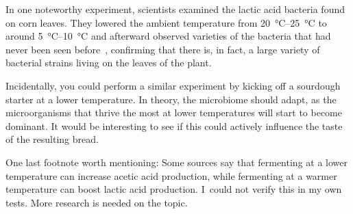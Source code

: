 In one noteworthy experiment, scientists examined the lactic acid bacteria
found on corn leaves. They lowered the ambient temperature from \qtyrange{20}{25}{\degreeCelsius} to around
\qtyrange{5}{10}{\degreeCelsius} and afterward observed varieties of the bacteria that had never been
seen before~\cite{temperature+bacteria+corn}, confirming that there is, in
fact, a large variety of bacterial strains living on the leaves of the plant.

Incidentally, you could perform a similar experiment by kicking off a sourdough
starter at a lower temperature. In theory, the microbiome should adapt, as the
microorganisms that thrive the most at lower temperatures will start to become
dominant. It would be interesting to see if this could actively influence the
taste of the resulting bread.

One last footnote worth mentioning: Some sources say that fermenting at a
lower temperature can increase acetic acid production, while fermenting at a
warmer temperature can boost lactic acid production. I~could not verify this
in my own tests. More research is needed on the topic.
